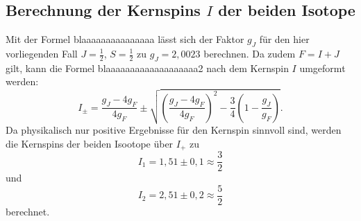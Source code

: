 \subsection{Berechnung der Kernspins $I$ der beiden Isotope}
Mit der Formel blaaaaaaaaaaaaaaa lässt sich der Faktor $g_J$ für den hier vorliegenden Fall $J=\frac{1}{2}$, $S=\frac{1}{2}$ zu $g_J=2,0023$ berechnen.
Da zudem $F=I+J$ gilt, kann die Formel blaaaaaaaaaaaaaaaaaaa2 nach dem Kernspin $I$ umgeformt werden:
\begin{equation}
I_\pm=\frac{g_J-4g_F}{4g_F}\pm \sqrt{\left(\frac{g_J-4g_F}{4g_F}\right)^2-\frac{3}{4}\left(1-\frac{g_J}{g_F}\right)}.
\end{equation}
Da physikalisch nur positive Ergebnisse für den Kernspin sinnvoll sind, werden die Kernspins der beiden Isootope über $I_+$ zu
\begin{equation}
I_1=1,51\pm0,1\approx \frac{3}{2}
\end{equation}
und
\begin{equation}
  I_2=2,51\pm0,2\approx \frac{5}{2}
\end{equation}
berechnet.
